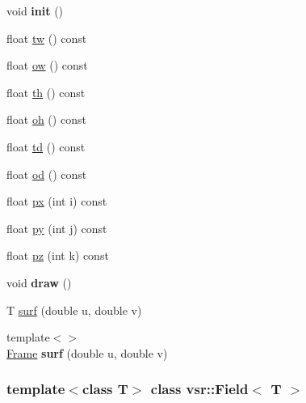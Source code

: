 \begin{DoxyCompactItemize}
\item 
\hypertarget{classvsr_1_1_field_a7985fc85872239b88b1af7ea2e864c34}{void {\bfseries init} ()}\label{classvsr_1_1_field_a7985fc85872239b88b1af7ea2e864c34}

\item 
float \hyperlink{classvsr_1_1_field_a2d0c55a7eafc0dd9f42324cd172b9a1a}{tw} () const 
\item 
float \hyperlink{classvsr_1_1_field_a47a09ea26f1ba5e0b79f111644cf4723}{ow} () const 
\item 
float \hyperlink{classvsr_1_1_field_a8a5e61672bcab1905c0b64538b23d665}{th} () const 
\item 
float \hyperlink{classvsr_1_1_field_aa1b914d5a03fe304de2408f6e241a342}{oh} () const 
\item 
float \hyperlink{classvsr_1_1_field_aee73108131278a2e2c5fdccec35216ef}{td} () const 
\item 
float \hyperlink{classvsr_1_1_field_aa6e2c7244fb2c062fc402c0b20e82468}{od} () const 
\item 
float \hyperlink{classvsr_1_1_field_aa93933495fca5fd687a89a6acb2302f3}{px} (int i) const 
\item 
float \hyperlink{classvsr_1_1_field_a8060e76df2861c20a91787063c0d836c}{py} (int j) const 
\item 
float \hyperlink{classvsr_1_1_field_a108cffe64bb09aadcc99ba91c24a02b7}{pz} (int k) const 
\item 
\hypertarget{classvsr_1_1_field_a59a75842c84e93aad38c5dee7e7f9593}{void {\bfseries draw} ()}\label{classvsr_1_1_field_a59a75842c84e93aad38c5dee7e7f9593}

\item 
T \hyperlink{classvsr_1_1_field_a93eeacd6c640b186a5e411b84d689b4d}{surf} (double u, double v)
\item 
\hypertarget{classvsr_1_1_field_a0f5ccbf40db2ffc15f3934a5f59e4130}{{\footnotesize template$<$$>$ }\\\hyperlink{classvsr_1_1_frame}{Frame} {\bfseries surf} (double u, double v)}\label{classvsr_1_1_field_a0f5ccbf40db2ffc15f3934a5f59e4130}

\end{DoxyCompactItemize}
\subsubsection*{template$<$class T$>$ class vsr\-::\-Field$<$ T $>$}



